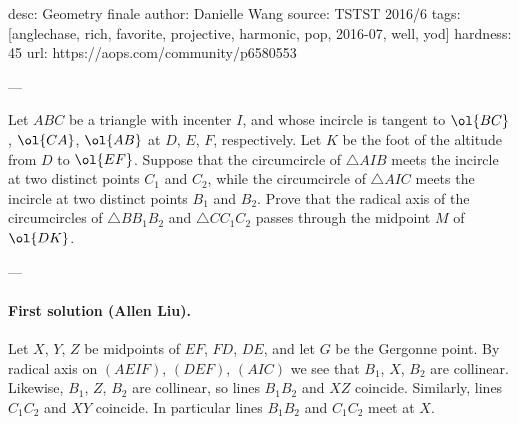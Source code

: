 desc:  Geometry finale
author: Danielle Wang
source:  TSTST 2016/6
tags:  [anglechase, rich, favorite, projective, harmonic, pop, 2016-07, well, yod]
hardness: 45
url: https://aops.com/community/p6580553

---

Let $ABC$ be a triangle with incenter $I$, and whose incircle is tangent
to $\ol{BC}$, $\ol{CA}$, $\ol{AB}$ at $D$, $E$, $F$, respectively.
Let $K$ be the foot of the altitude from $D$ to $\ol{EF}$.
Suppose that the circumcircle of $\triangle AIB$
meets the incircle at two distinct points $C_1$ and $C_2$,
while the circumcircle of $\triangle AIC$ meets the incircle
at two distinct points $B_1$ and $B_2$.
Prove that the radical axis of the circumcircles of
$\triangle BB_1B_2$ and $\triangle CC_1C_2$ passes through the midpoint $M$ of $\ol{DK}$.

---

\paragraph{First solution (Allen Liu).}
Let $X$, $Y$, $Z$ be midpoints of $EF$, $FD$, $DE$, and let $G$ be the Gergonne point.
By radical axis on $(AEIF)$, $(DEF)$, $(AIC)$ we see that $B_1$, $X$, $B_2$ are collinear.
Likewise, $B_1$, $Z$, $B_2$ are collinear, so lines $B_1B_2$ and $XZ$ coincide.
Similarly, lines $C_1C_2$ and $XY$ coincide.
In particular lines $B_1B_2$ and $C_1C_2$ meet at $X$.

